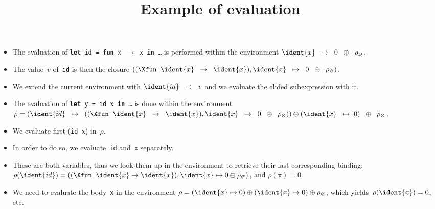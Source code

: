 \documentclass[wide]{slides}
\begin{document}
\begin{slide}
  \title{Example of evaluation}

  \begin{itemize}

    \item The evaluation of \texttt{\textbf{let} id = \textbf{fun} x
      \(\rightarrow\) x \textbf{in} \ldots} is performed within the
      environment $\ident{x} \;\; \mapsto \;\; 0 \;\; \oplus \;\;
      \rho_\varnothing$.

    \item The value~\(v\) of~\texttt{id} is then the closure $((\Xfun
      \;\; \ident{x} \;\; \rightarrow \;\; \ident{x}), \ident{x} \;\;
      \mapsto \;\; 0 \;\; \oplus \;\; \rho_\varnothing)$.

    \item We extend the current environment with $\ident{id} \;\;
      \mapsto \;\; v$ and we evaluate the elided subexpression with
      it.

    \item The evaluation of \texttt{\textbf{let} y = id x \textbf{in}
      \ldots} is done within the environment $\rho = (\ident{id} \;\;
      \mapsto \;\; ((\Xfun \;\; \ident{x} \;\; \rightarrow \;\;
      \ident{x}), \ident{x} \;\; \mapsto \;\; 0 \;\; \oplus \;\;
      \rho_\varnothing)) \oplus (\ident{x} \;\; \mapsto \; 0) \;\;
      \oplus \;\; \rho_\varnothing$.

    \item We evaluate first (\texttt{id x}) in~\(\rho\).

    \item In order to do so, we evaluate~\texttt{id} and~\texttt{x}
      separately.

    \item These are both variables, thus we look them up in the
      environment to retrieve their last corresponding binding:
      \(\rho(\ident{id}) = ((\Xfun \;\; \ident{x} \rightarrow
      \ident{x}), \ident{x} \mapsto 0 \oplus \rho_\varnothing)\), and
      \(\rho(\texttt{x}) = 0\).

    \item We need to evaluate the body~\texttt{x} in the environment
      $\rho = (\ident{x} \mapsto 0) \oplus (\ident{x} \mapsto 0)
      \oplus \rho_\varnothing$, which yields~\(\rho(\ident{x}) = 0\),
      etc.

  \end{itemize}

\end{slide}
\end{document}
